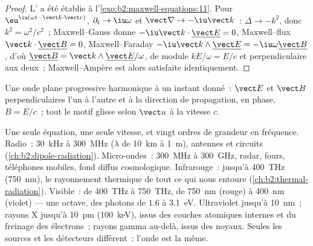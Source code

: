 \begin{proof}
L' a été établie à l'\cref{exo:b2:maxwell-equations:11}.
Pour $\eu^{\iu(\omega t - \vect k\cdot\vect r)}$, $\partial_t \to \iu\omega$ et $\vect\nabla \to
-\iu\vect k$~: $\Delta \to -k^2$, donc $k^2 = \omega^2/c^2$~; Maxwell--Gauss donne $-\iu
\vect k\cdot\underline{\vect E} = 0$, Maxwell--flux $\vect k\cdot\underline{\vect B} = 0$,
Maxwell--Faraday $-\iu\vect k\wedge\underline{\vect E} = -\iu\omega\underline{\vect B}$, d'où
$\underline{\vect B} = \vect k\wedge\underline{\vect E}/\omega$, de module $kE/\omega = E/c$ et
perpendiculaire aux deux~; Maxwell--Ampère est alors satisfaite identiquement.
\end{proof}

\begin{omfigure}

{\small Une onde plane progressive harmonique à un instant donné~: $\vect E$ et
$\vect B$ perpendiculaires l'un à l'autre et à la direction de propagation, en
phase, $B = E/c$~; tout le motif glisse selon $\vect u$ à la vitesse $c$.}
\end{omfigure}

\begin{remark}[Le spectre]\label{rem:b2:plane-waves-polarization:spectrum}
Une seule équation, une seule vitesse, et vingt ordres de grandeur en fréquence.
Radio~: \qty{30}{kHz} à \qty{300}{MHz} ($\lambda$ de \qty{10}{km} à \qty{1}{m}),
antennes et circuits (\cref{ch:b2:dipole-radiation}). Micro-ondes~:
\qty{300}{MHz} à \qty{300}{GHz}, radar, fours, téléphones mobiles, fond diffus
cosmologique. Infrarouge~: jusqu'à \qty{400}{THz} (\qty{750}{nm}), le rayonnement
thermique de tout ce qui nous entoure (\cref{ch:b2:thermal-radiation}).
Visible~: de \qty{400}{THz} à \qty{750}{THz}, de \qty{750}{nm} (rouge) à \qty{400}{nm}
(violet) --- une octave, des photons de $1.6$ à \qty{3.1}{eV}. Ultraviolet jusqu'à
\qty{10}{nm}~; rayons X jusqu'à \qty{10}{pm} (\qty{100}{keV}), issus des couches atomiques internes
et du freinage des électrons~; rayons gamma au-delà, issus des noyaux. Seules les sources
et les détecteurs diffèrent~: l'onde est la même.
\end{remark}


